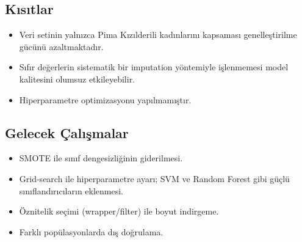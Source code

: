 \documentclass[12pt,a4paper]{article}
\begin{document}
\subsection{Kısıtlar}

\begin{itemize}
  \item Veri setinin yalnızca Pima Kızılderili kadınlarını kapsaması
        genelleştirilme gücünü azaltmaktadır.
  \item Sıfır değerlerin sistematik bir imputation yöntemiyle işlenmemesi
        model kalitesini olumsuz etkileyebilir.
  \item Hiperparametre optimizasyonu yapılmamıştır.
\end{itemize}

\subsection{Gelecek Çalışmalar}

\begin{itemize}
  \item SMOTE ile sınıf dengesizliğinin giderilmesi.
  \item Grid-search ile hiperparametre ayarı; SVM ve Random Forest gibi
        güçlü sınıflandırıcıların eklenmesi.
  \item Öznitelik seçimi (wrapper/filter) ile boyut indirgeme.
  \item Farklı popülasyonlarda dış doğrulama.
\end{itemize}
\end{document}

